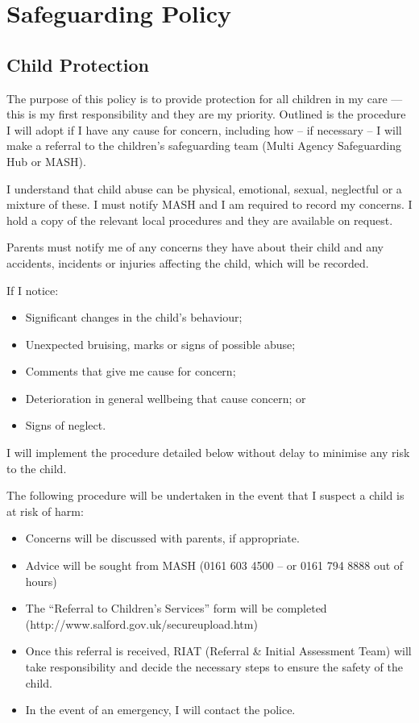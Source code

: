 

\section{Safeguarding Policy}

\subsection{Child Protection}

The purpose of this policy is to provide protection for all children in
my care --- this is my first responsibility and they are my priority.
Outlined is the procedure I will adopt if I have any cause for concern,
including how -- if necessary -- I will make a referral to the
children's safeguarding team (Multi Agency Safeguarding Hub or MASH).

I understand that child abuse can be physical, emotional, sexual,
neglectful or a mixture of these. I must notify MASH and I am required
to record my concerns. I hold a copy of the relevant local procedures
and they are available on request.

Parents must notify me of any concerns they have about their child and
any accidents, incidents or injuries affecting the child, which will be
recorded.

If I notice:
\begin{itemize}[topsep=0pt]
\item
  Significant changes in the child's behaviour;
\item
  Unexpected bruising, marks or signs of possible abuse;
\item
  Comments that give me cause for concern;
\item
  Deterioration in general wellbeing that cause concern; or
\item
  Signs of neglect.
\end{itemize}

I will implement the procedure detailed below without delay to minimise
any risk to the child.

The following procedure will be undertaken in the event that I suspect a
child is at risk of harm:
\begin{itemize}[topsep=0pt]
\item
  Concerns will be discussed with parents, if appropriate.
\item
  Advice will be sought from MASH (0161 603 4500 -- or 0161 794 8888
  out of hours)
\item
  The ``Referral to Children's Services'' form will be completed
  (http://www.salford.gov.uk/secureupload.htm)
\item
  Once this referral is received, RIAT (Referral \& Initial Assessment
  Team) will take responsibility and decide the necessary steps to
  ensure the safety of the child.
\item
  In the event of an emergency, I will contact the police.
\end{itemize}

